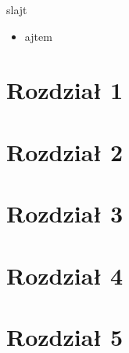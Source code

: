 \documentclass{beamer}
\begin{document}
\begin{frame}{slajt}
\begin{itemize}
	\item ajtem
\end{itemize}
\end{frame}


\section{Rozdział 1}
\section{Rozdział 2}
\section{Rozdział 3}
\section{Rozdział 4}
\section{Rozdział 5}
\end{document}
